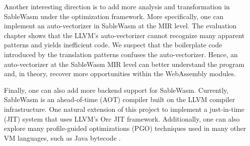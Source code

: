 Another interesting direction is to add more analysis and transformation in
SableWasm under the optimization framework. More specifically, one can implement
an auto-vectorizer in SableWasm at the MIR level. The evaluation chapter shows
that the LLVM's auto-vectorizer cannot recognize many apparent patterns and
yields inefficient code. We suspect that the boilerplate code introduced by
the translation patterns confuses the auto-vectorizer. Hence, an auto-vectorizer
at the SableWasm MIR level can better understand the program and, in theory,
recover more opportunities within the WebAssembly modules.

Finally, one can also add more backend support for SableWasm. Currently,
SableWasm is an ahead-of-time (AOT) compiler built on the LLVM compiler
infrastructure. One natural extension of this project to implement a
just-in-time (JIT) system that uses LLVM's Orc JIT framework. Additionally,
one can also explore many profile-guided optimizations (PGO) techniques used
in many other VM languages, such as Java bytecode \cite{java-pgo}.